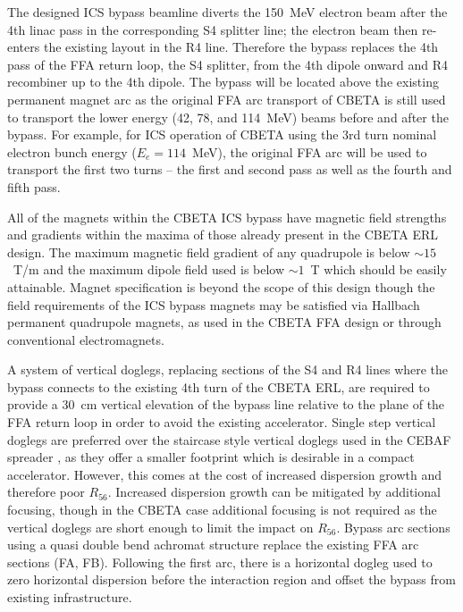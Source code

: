 \documentclass[../main.tex]{subfiles}
\begin{document}
The designed ICS bypass beamline diverts the 150~\si{\mega\electronvolt} electron beam after the 4th linac pass in the corresponding S4 splitter line; the electron beam then re-enters the existing layout in the R4 line. Therefore the bypass replaces the 4th pass of the FFA return loop, the S4 splitter, from the 4th dipole onward and R4 recombiner up to the 4th dipole. The bypass will be located above the existing permanent magnet arc as the original FFA arc transport of CBETA is still used to transport the lower energy (42, 78, and 114~MeV) beams before and after the bypass. For example, for ICS operation of CBETA using the 3rd turn nominal electron bunch energy ($E_{e} = 114$~\si{\mega\electronvolt}), the original FFA arc will be used to transport the first two turns -- the first and second pass as well as the fourth and fifth pass. 

All of the magnets within the CBETA ICS bypass have magnetic field strengths and gradients within the maxima of those already present in the CBETA ERL design. The maximum magnetic field gradient of any quadrupole is below $\sim15$~\si{\tesla}/\si{\meter} and the maximum dipole field used is below $\sim1$~\si{\tesla} which should be easily attainable. Magnet specification is beyond the scope of this design though the field requirements of the ICS bypass magnets may be satisfied via Hallbach permanent quadrupole magnets, as used in the CBETA FFA design or through conventional electromagnets.

A system of vertical doglegs, replacing sections of the S4 and R4 lines where the bypass connects to the existing 4th turn of the CBETA ERL, are required to provide a 30~\si{\centi\meter} vertical elevation of the bypass line relative to the plane of the FFA return loop in order to avoid the existing accelerator. Single step vertical doglegs are preferred over the staircase style vertical doglegs used in the CEBAF spreader \cite{york1987optics}, as they offer a smaller footprint which is desirable in a compact accelerator. However, this comes at the cost of increased dispersion growth and therefore poor $R_{56}$. Increased dispersion growth can be mitigated by additional focusing, though in the CBETA case additional focusing is not required as the vertical doglegs are short enough to limit the impact on $R_{56}$.   
Bypass arc sections using a quasi double bend achromat structure replace the existing FFA arc sections (FA, FB). Following the first arc, there is a horizontal dogleg used to zero horizontal dispersion before the interaction region and offset the bypass from existing infrastructure. 
\end{document}
